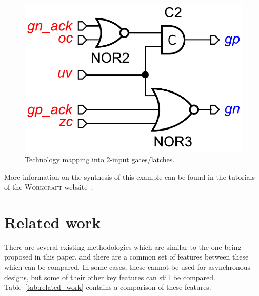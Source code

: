 \documentclass[british, journal]{IEEEtran}
\newcommand{\noun}[1]{\textsc{#1}}
\begin{document}
\begin{figure}[h]
\begin{centering}
\includegraphics[scale=0.35]{Images/circuit-buck-deco2-wc}
\par\end{centering}
\protect\caption{\label{fig:circuit-buck-deco2}Technology mapping into 2-input gates/latches.}
\end{figure}

More information on the synthesis of this example can be found in the tutorials of the \noun{Workcraft} website~\cite{Workcraft_website}.



\section{Related work\label{sec:related-work}}

There are several existing methodologies which are similar to the
one being proposed in this paper, and there are a common set of features between these which can be compared.
In some cases, these cannot be used for asynchronous designs, but some of their other key features can still be compared.
Table~\ref{tab:related_work} contains a comparison of these features.
\end{document}
